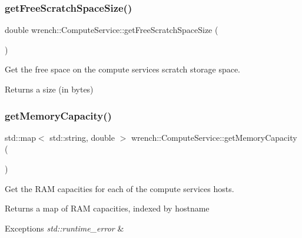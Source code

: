 \subsubsection{\texorpdfstring{get\+Free\+Scratch\+Space\+Size()}{getFreeScratchSpaceSize()}}
{\footnotesize\ttfamily double wrench\+::\+Compute\+Service\+::get\+Free\+Scratch\+Space\+Size (\begin{DoxyParamCaption}{ }\end{DoxyParamCaption})}



Get the free space on the compute service\textquotesingle{}s scratch storage space. 

\begin{DoxyReturn}{Returns}
a size (in bytes) 
\end{DoxyReturn}
\mbox{\label{classwrench_1_1_compute_service_a113d9698fc83cefd78121e279b99b51e}} 
\subsubsection{\texorpdfstring{get\+Memory\+Capacity()}{getMemoryCapacity()}}
{\footnotesize\ttfamily std\+::map$<$ std\+::string, double $>$ wrench\+::\+Compute\+Service\+::get\+Memory\+Capacity (\begin{DoxyParamCaption}{ }\end{DoxyParamCaption})}



Get the R\+AM capacities for each of the compute service\textquotesingle{}s hosts. 

\begin{DoxyReturn}{Returns}
a map of R\+AM capacities, indexed by hostname
\end{DoxyReturn}

\begin{DoxyExceptions}{Exceptions}
{\em std\+::runtime\+\_\+error} & \\
\hline
\end{DoxyExceptions}
\mbox{\label{classwrench_1_1_compute_service_a0d88426f33110e811771f73f39c6458a}} 
